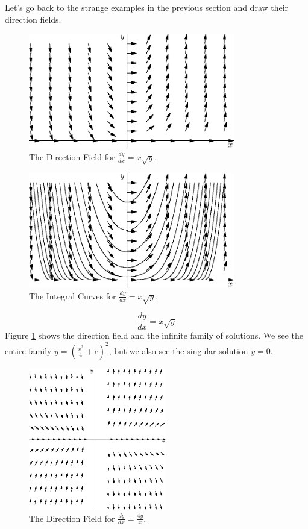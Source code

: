 \documentclass[fleqn,letterpaper]{report}
\begin{document}
Let's go back to the strange examples in the previous section
and draw their direction fields.

\begin{figure}[t]
\centering
\includegraphics[width=9cm]{figure08.eps}
\caption{The Direction Field for $\frac{dy}{dx} = x \sqrt{y}$.}
\label{figure-direction-field2}
\end{figure}

\begin{figure}[t]
\centering
\includegraphics[width=9cm]{figure09.eps}
\caption{The Integral Curves for $\frac{dy}{dx} = x \sqrt{y}$.}
\label{figure-direction-field2-curves}
\end{figure}

\begin{example}
\begin{equation*}
\frac{dy}{dx} = x \sqrt{y}
\end{equation*}
Figure \ref{figure-direction-field2} shows the direction field
and the infinite family of solutions.  We see the entire
family $y = (\frac{x^2}{4} + c)^2$, but we also see the
singular solution $y=0$. 
\end{example}

\begin{figure}[t]
\centering
\includegraphics[width=6cm]{figure10.eps}
\caption{The Direction Field for $\frac{dy}{dx} = \frac{4y}{x}$.}
\label{figure-direction-field3}
\end{figure}
\end{document}
